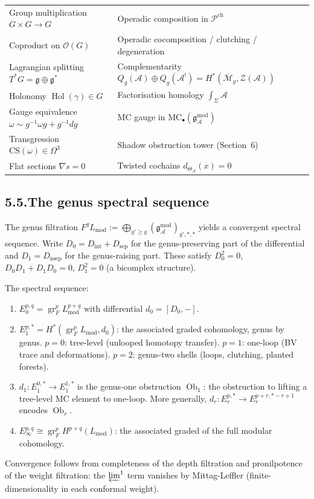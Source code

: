 \documentclass[11pt]{report}
\theoremstyle{definition}
\theoremstyle{remark}
\providecommand{\cA}{\mathcal{A}}
\providecommand{\cM}{\mathcal{M}}
\providecommand{\cO}{\mathcal{O}}
\providecommand{\cP}{\mathcal{P}}
\providecommand{\fg}{\mathfrak{g}}
\providecommand{\gAmod}{\mathfrak{g}^{\mathrm{mod}}_\cA}
\numberwithin{equation}{section}
\begin{document}
\begin{center}
\begin{tabular}{ll}
Group multiplication $G\times G\to G$
 & Operadic composition in $\cP^{\mathrm{ch}}$\\[2pt]
Coproduct on $\cO(G)$
 & Operadic cocomposition / clutching / degeneration\\[2pt]
Lagrangian splitting $T^*G=\fg\oplus\fg^*$
 & Complementarity $Q_g(\cA)\oplus Q_g(\cA^!)
 =H^*(\overline{\cM}_g,\mathcal Z(\cA))$\\[2pt]
Holonomy $\operatorname{Hol}(\gamma)\in G$
 & Factorisation homology $\int_\Sigma\cA$\\[2pt]
Gauge equivalence $\omega\sim g^{-1}\omega g+g^{-1}dg$
 & MC gauge in
 $\mathrm{MC}_\bullet(\gAmod)$\\[2pt]
Transgression $\mathrm{CS}(\omega)\in\Omega^3$
 & Shadow obstruction tower (Section~6)\\[2pt]
Flat sections $\nabla s=0$
 & Twisted cochains $d_{\Theta_\cA}(x)=0$
\end{tabular}
\end{center}

\subsection*{5.5.\enspace The genus spectral sequence}

The genus filtration $F^g L_{\mathrm{mod}}:=\bigoplus_{g'\ge g}
(\gAmod)_{g',*,*}$ yields a convergent spectral sequence. Write
$D_0=D_{\mathrm{int}}+D_{\mathrm{sep}}$ for the genus-preserving
part of the differential and $D_1=D_{\mathrm{nsep}}$ for the
genus-raising part. These satisfy $D_0^2=0$,
$D_0D_1+D_1D_0=0$, $D_1^2=0$ (a bicomplex structure).

The spectral sequence:
\begin{enumerate}[label=(\roman*)]
\item $E_0^{p,q}=\operatorname{gr}_F^p L_{\mathrm{mod}}^{p+q}$
 with differential $d_0=[D_0,-]$.
\item $E_1^{p,*}=H^*(\operatorname{gr}_F^p L_{\mathrm{mod}},d_0)$:
 the associated graded cohomology, genus by genus. $p=0$:
 tree-level (unlooped homotopy transfer). $p=1$:
 one-loop (BV trace and deformations). $p=2$:
 genus-two shells (loops, clutching, planted forests).
\item $d_1\colon E_1^{0,*}\to E_1^{1,*}$ is the genus-one
 obstruction $\operatorname{Ob}_1$: the obstruction to lifting a
 tree-level MC element to one-loop. More generally,
 $d_r\colon E_r^{p,*}\to E_r^{p+r,*-r+1}$ encodes
 $\operatorname{Ob}_r$.
\item $E_\infty^{p,q}\cong\operatorname{gr}_F^p H^{p+q}
 (L_{\mathrm{mod}})$: the associated graded of the full modular
 cohomology.
\end{enumerate}
Convergence follows from completeness of the depth filtration and
pronilpotence of the weight filtration: the
$\varprojlim^1$ term vanishes by Mittag-Leffler
(finite-dimensionality in each conformal weight).
\end{document}
